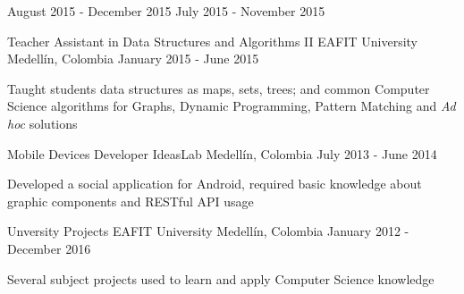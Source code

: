\begin{cventries}
{\begin{cvsubentries}
                      {August 2015 - December 2015}{}
                      {July 2015 - November 2015}{}
      \end{cvsubentries}
    }
  \cventry
    {Teacher Assistant in Data Structures and Algorithms II}
    {EAFIT University}
    {Medellín, Colombia}
    {January 2015 - June 2015}
    {
      \begin{cvitems}
        \item {Taught students data structures as maps, sets, trees; and common Computer Science
               algorithms for Graphs, Dynamic Programming, Pattern Matching and \textit{Ad hoc}
               solutions}
      \end{cvitems}
    }
  \cventry
    {Mobile Devices Developer}
    {IdeasLab}
    {Medellín, Colombia}
    {July 2013 - June 2014}
    {
      \begin{cvitems}
        \item {Developed a social application for Android, required basic knowledge about graphic
               components and RESTful API usage}
      \end{cvitems}
      \begin{cvsubentries}
      \end{cvsubentries}
    }
    \cventry
      {Unversity Projects}
      {EAFIT University}
      {Medellín, Colombia}
      {January 2012 - December 2016}
      {
        \begin{cvitems}
          \item {Several subject projects used to learn and apply Computer Science knowledge}
        \end{cvitems}
        \begin{cvsubentries}
        \end{cvsubentries}
      }
\end{cventries}
